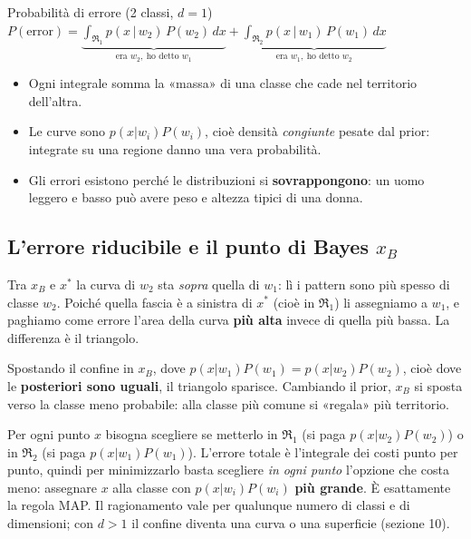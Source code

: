 \begin{formulat}{Probabilità di errore (2 classi, $d=1$)}
$\displaystyle P(\mathrm{error})=\underbrace{\int_{\Re_1} p(x\,|\,w_2)\,P(w_2)\,dx}_{\text{era }w_2,\ \text{ho detto }w_1}+\underbrace{\int_{\Re_2} p(x\,|\,w_1)\,P(w_1)\,dx}_{\text{era }w_1,\ \text{ho detto }w_2}$
\end{formulat}


\begin{intuizione}
\begin{itemize}
  \item Ogni integrale somma la «massa» di una classe che cade nel territorio dell'altra.
  \item Le curve sono $p(x|w_i)P(w_i)$, cioè densità \emph{congiunte} pesate dal prior: integrate su una regione danno una vera probabilità.
  \item Gli errori esistono perché le distribuzioni si \textbf{sovrappongono}: un uomo leggero e basso può avere peso e altezza tipici di una donna.
\end{itemize}
\end{intuizione}

\subsection{L'errore riducibile e il punto di Bayes $x_B$}
Tra $x_B$ e $x^*$ la curva di $w_2$ sta \emph{sopra} quella di $w_1$: lì i pattern sono più spesso di classe $w_2$. Poiché quella fascia è a sinistra di $x^*$ (cioè in $\Re_1$) li assegniamo a $w_1$, e paghiamo come errore l'area della curva \textbf{più alta} invece di quella più bassa. La differenza è il triangolo.

Spostando il confine in $x_B$, dove $p(x|w_1)P(w_1)=p(x|w_2)P(w_2)$, cioè dove le \textbf{posteriori sono uguali}, il triangolo sparisce. Cambiando il prior, $x_B$ si sposta verso la classe meno probabile: alla classe più comune si «regala» più territorio.

\begin{tecnica}
Per ogni punto $x$ bisogna scegliere se metterlo in $\Re_1$ (si paga $p(x|w_2)P(w_2)$) o in $\Re_2$ (si paga $p(x|w_1)P(w_1)$). L'errore totale è l'integrale dei costi punto per punto, quindi per minimizzarlo basta scegliere \emph{in ogni punto} l'opzione che costa meno: assegnare $x$ alla classe con $p(x|w_i)P(w_i)$ \textbf{più grande}. È esattamente la regola MAP. Il ragionamento vale per qualunque numero di classi e di dimensioni; con $d>1$ il confine diventa una curva o una superficie (sezione 10).
\end{tecnica}

